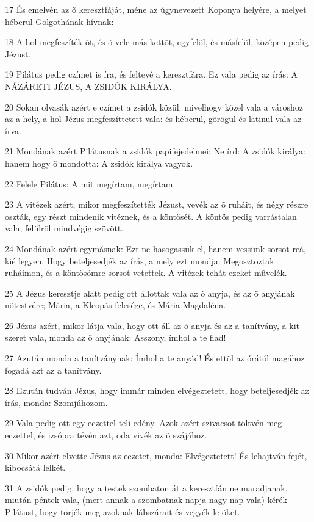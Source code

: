 \par 17 És emelvén az õ keresztfáját, méne az úgynevezett Koponya helyére, a melyet héberül Golgothának hívnak:
\par 18 A hol megfeszíték õt, és õ vele más kettõt, egyfelõl, és másfelõl, középen pedig Jézust.
\par 19 Pilátus pedig czímet is íra, és feltevé a keresztfára. Ez vala pedig az írás: A NÁZÁRETI JÉZUS, A ZSIDÓK KIRÁLYA.
\par 20 Sokan olvasák azért e czímet a zsidók közül; mivelhogy közel vala a városhoz az a hely, a hol Jézus megfeszíttetett vala: és héberül, görögül és latinul vala az írva.
\par 21 Mondának azért Pilátusnak a zsidók papifejedelmei: Ne írd: A zsidók királya: hanem hogy õ mondotta: A zsidók királya vagyok.
\par 22 Felele Pilátus: A mit megírtam, megírtam.
\par 23 A vitézek azért, mikor megfeszítették Jézust, vevék az õ ruháit, és négy részre oszták, egy részt mindenik vitéznek, és a köntösét. A köntös pedig varrástalan vala, felülrõl mindvégig szövött.
\par 24 Mondának azért egymásnak: Ezt ne hasogassuk el, hanem vessünk sorsot reá, kié legyen. Hogy beteljesedjék az írás, a mely ezt mondja: Megosztoztak ruháimon, és a köntösömre sorsot vetettek. A vitézek tehát ezeket mûvelék.
\par 25 A Jézus keresztje alatt pedig ott állottak vala az õ anyja, és az õ anyjának nõtestvére; Mária, a Kleopás felesége, és Mária Magdaléna.
\par 26 Jézus azért, mikor látja vala, hogy ott áll az õ anyja és az a tanítvány, a kit szeret vala, monda az õ anyjának: Asszony, ímhol a te fiad!
\par 27 Azután monda a tanítványnak: Ímhol a te anyád! És ettõl az órától magához fogadá azt az a tanítvány.
\par 28 Ezután tudván Jézus, hogy immár minden elvégeztetett, hogy beteljesedjék az írás, monda: Szomjúhozom.
\par 29 Vala pedig ott egy eczettel teli edény. Azok azért szivacsot töltvén meg eczettel, és izsópra tévén azt, oda vivék az õ szájához.
\par 30 Mikor azért elvette Jézus az eczetet, monda: Elvégeztetett! És lehajtván fejét, kibocsátá lelkét.
\par 31 A zsidók pedig, hogy a testek szombaton át a keresztfán ne maradjanak, miután péntek vala, (mert annak a szombatnak napja nagy nap vala) kérék Pilátust, hogy törjék meg azoknak lábszárait és vegyék le õket.
